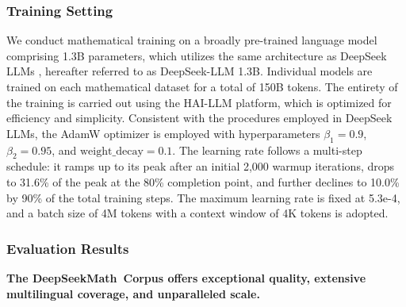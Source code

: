 \subsubsection{Training Setting}
\label{sec:quality-policy}
We conduct mathematical training on a broadly pre-trained language model comprising 1.3B parameters, which utilizes the same architecture as DeepSeek LLMs \citep{deepseek-llm}, hereafter referred to as DeepSeek-LLM 1.3B. Individual models are trained on each mathematical dataset for a total of 150B tokens. The entirety of the training is carried out using the HAI-LLM \citep{haillm} platform, which is optimized for efficiency and simplicity. Consistent with the procedures employed in DeepSeek LLMs, the AdamW optimizer \citep{adamW} is employed with hyperparameters $\beta_1=0.9$, $\beta_2=0.95$, and $\mathrm{weight\_decay}=0.1$. The learning rate follows a multi-step schedule: it ramps up to its peak after an initial 2,000 warmup iterations, drops to 31.6\% of the peak at the 80\% completion point, and further declines to 10.0\% by 90\% of the total training steps. The maximum learning rate is fixed at 5.3e-4, and a batch size of 4M tokens with a context window of 4K tokens is adopted.

\subsubsection{Evaluation Results}

\textbf{The DeepSeekMath~Corpus offers exceptional quality, extensive multilingual coverage, and unparalleled scale.}

